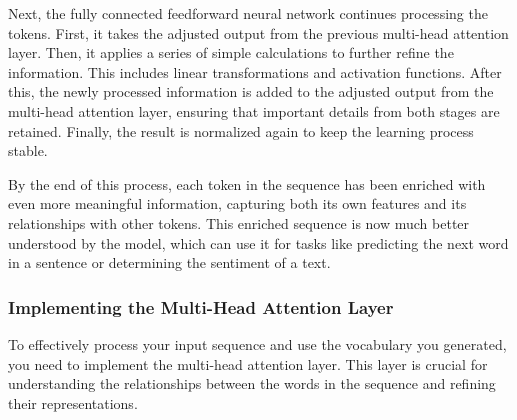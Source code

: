 
Next, the fully connected feedforward neural network continues processing the tokens. First, it takes the adjusted output from the previous multi-head attention layer. Then, it applies a series of simple calculations to further refine the information. This includes linear transformations and activation functions. After this, the newly processed information is added to the adjusted output from the multi-head attention layer, ensuring that important details from both stages are retained. Finally, the result is normalized again to keep the learning process stable.

By the end of this process, each token in the sequence has been enriched with even more meaningful information, capturing both its own features and its relationships with other tokens. This enriched sequence is now much better understood by the model, which can use it for tasks like predicting the next word in a sentence or determining the sentiment of a text.

\subsubsection{Implementing the Multi-Head Attention Layer}

To effectively process your input sequence and use the vocabulary you generated, you need to implement the multi-head attention layer. This layer is crucial for understanding the relationships between the words in the sequence and refining their representations. 

